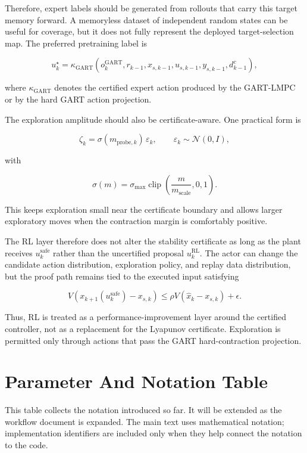 \documentclass[11pt]{article}
\begin{document}
Therefore, expert labels should be generated from rollouts that carry this target memory forward. A memoryless dataset of independent random states can be useful for coverage, but it does not fully represent the deployed target-selection map. The preferred pretraining label is


\[
u_k^{\star}
=
\kappa_{\mathrm{GART}}
\left(
o_k^{\mathrm{GART}},
r_{k-1},
x_{s,k-1},
u_{s,k-1},
y_{s,k-1},
d^c_{k-1}
\right),
\]

where $\kappa_{\mathrm{GART}}$ denotes the certified expert action produced by the GART-LMPC or by the hard GART action projection.


The exploration amplitude should also be certificate-aware. One practical form is


\[
\zeta_k
=
\sigma(m_{\mathrm{probe},k})\,\varepsilon_k,
\qquad
\varepsilon_k\sim\mathcal N(0,I),
\]

with


\[
\sigma(m)
=
\sigma_{\max}
\operatorname{clip}
\left(
\frac{m}{m_{\mathrm{scale}}},
0,
1
\right).
\]

This keeps exploration small near the certificate boundary and allows larger exploratory moves when the contraction margin is comfortably positive.


The RL layer therefore does not alter the stability certificate as long as the plant receives $u_k^{\mathrm{safe}}$ rather than the uncertified proposal $u_k^{\mathrm{RL}}$. The actor can change the candidate action distribution, exploration policy, and replay data distribution, but the proof path remains tied to the executed input satisfying


\[
V(x_{k+1}(u_k^{\mathrm{safe}})-x_{s,k})
\le
\rho V(\hat x_k-x_{s,k})+\epsilon.
\]

Thus, RL is treated as a performance-improvement layer around the certified controller, not as a replacement for the Lyapunov certificate. Exploration is permitted only through actions that pass the GART hard-contraction projection.


\section*{Parameter And Notation Table}

This table collects the notation introduced so far. It will be extended as the workflow document is expanded. The main text uses mathematical notation; implementation identifiers are included only when they help connect the notation to the code.
\end{document}
